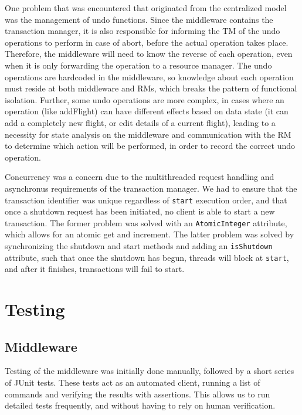 \documentclass[11pt]{article}
\begin{document}
One problem that was encountered that originated from the centralized model was the management of undo functions. Since the middleware contains the transaction manager, it is also responsible for informing the TM of the undo operations to perform in case of abort, before the actual operation takes place. Therefore, the middleware will need to know the reverse of each operation, even when it is only forwarding the operation to a resource manager. The undo operations are hardcoded in the middleware, so knowledge about each operation must reside at both middleware and RMs, which breaks the pattern of functional isolation. Further, some undo operations are more complex, in cases where an operation (like addFlight) can have different effects based on data state (it can add a completely new flight, or edit details of a current flight), leading to a necessity for state analysis on the middleware and communication with the RM to determine which action will be performed, in order to record the correct undo operation. \par

Concurrency was a concern due to the multithreaded request handling and asynchronus requirements of the transaction manager. We had to ensure that the transaction identifier was unique regardless of \texttt{start} execution order, and that once a shutdown request has been initiated, no client is able to start a new transaction. The former problem was solved with an \texttt{AtomicInteger} attribute, which allows for an atomic get and increment. The latter problem was solved by synchronizing the shutdown and start methods and adding an \texttt{isShutdown} attribute, such that once the shutdown has begun, threads will block at \texttt{start}, and after it finishes, transactions will fail to start. \par

\section*{Testing}

\subsection*{Middleware}

Testing of the middleware was initially done manually, followed by a short series of JUnit tests. These tests act as an automated client, running a list of commands and verifying the results with assertions. This allows us to run detailed tests frequently, and without having to rely on human verification.  \par
\end{document}
